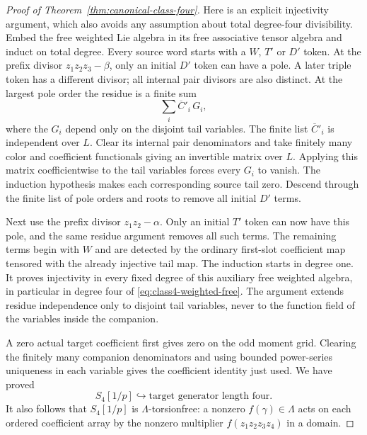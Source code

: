 \documentclass[11pt]{article}
\theoremstyle{definition}\newtheorem{definition}[theorem]{Definition}
\begin{document}
\begin{proof}[Proof of Theorem~\ref{thm:canonical-class-four}]
Here is an explicit injectivity argument, which also
avoids any assumption about total degree-four
divisibility. Embed the free weighted Lie algebra
in its free associative tensor algebra and induct on
total degree. Every source word starts with a $W$,
$T'$ or $D'$ token. At the prefix divisor
$z_1z_2z_3-\beta$, only an initial $D'$ token can have
a pole. A later triple token has a different divisor;
all internal pair divisors are also distinct. At the
largest pole order the residue is a finite sum
\[
                   \sum_i\overline C'_i\,G_i,
\]
where the $G_i$ depend only on the disjoint tail
variables. The finite list $\overline C'_i$ is
independent over $L$. Clear its internal pair
denominators and take finitely many color and
coefficient functionals giving an invertible matrix
over $L$. Applying this matrix coefficientwise to the
tail variables forces every $G_i$ to vanish. The
induction hypothesis makes each corresponding source
tail zero. Descend through the finite list of pole
orders and roots to remove all initial $D'$ terms.

Next use the prefix divisor $z_1z_2-\alpha$. Only an
initial $T'$ token can now have this pole, and the same
residue argument removes all such terms. The remaining
terms begin with $W$ and are detected by the ordinary
first-slot coefficient map tensored with the already
injective tail map. The induction starts in degree
one. It proves injectivity in every fixed degree of
this auxiliary free weighted algebra, in particular
in degree four of \eqref{eq:class4-weighted-free}.
The argument extends residue independence only to
disjoint tail variables, never to the function field
of the variables inside the companion.

A zero actual target coefficient first gives zero on
the odd moment grid. Clearing the finitely many
companion denominators and using bounded power-series
uniqueness in each variable gives the coefficient
identity just used. We have proved
\begin{equation}\label{eq:class4-rational-injection}
 S_4[1/p]\hookrightarrow
                     \text{target generator length four}.
\end{equation}
It also follows that $S_4[1/p]$ is $\Lambda$-torsionfree:
a nonzero $f(\gamma)\in\Lambda$ acts on each ordered
coefficient array by the nonzero multiplier
$f(z_1z_2z_3z_4)$ in a domain.


\end{proof}
\end{document}

